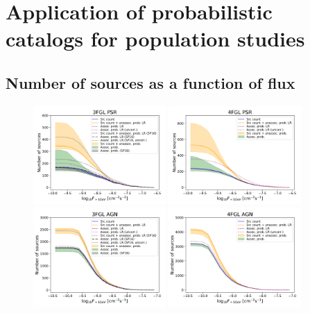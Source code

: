 \section{Application of probabilistic catalogs for population studies}

\subsection{Number of sources as a function of flux}



\begin{figure}[h]
\center
\includegraphics[width=0.45\textwidth]{plots/N_logS_3FGL_PSR_SazP_add_os.pdf}
\includegraphics[width=0.45\textwidth]{plots/N_logS_4FGL_PSR_add_os.pdf} \\
\includegraphics[width=0.45\textwidth]{plots/N_logS_3FGL_AGN_SazP_add_os.pdf}
\includegraphics[width=0.45\textwidth]{plots/N_logS_4FGL_AGN_add_os.pdf}

\end{figure}
